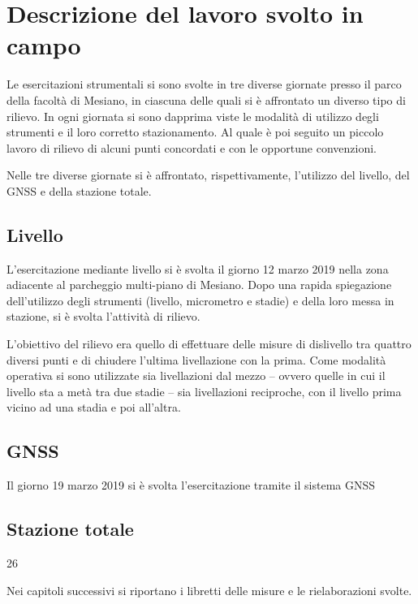 \chapter{Descrizione del lavoro svolto in campo}
Le esercitazioni strumentali si sono svolte in tre diverse giornate presso il  parco della facoltà di Mesiano, in ciascuna delle quali si è affrontato un diverso tipo di rilievo.
In ogni giornata si sono dapprima viste le modalità di utilizzo degli strumenti e il loro corretto stazionamento.
Al quale è poi seguito un piccolo lavoro di rilievo di alcuni punti concordati e con le opportune convenzioni.

Nelle tre diverse giornate si è affrontato, rispettivamente, l'utilizzo del livello, del GNSS e della stazione totale.

\section{Livello}
L'esercitazione mediante livello si è svolta il giorno 12 marzo 2019 nella zona adiacente al parcheggio multi-piano di Mesiano.
Dopo una rapida spiegazione dell'utilizzo degli strumenti (livello, micrometro e stadie) e della loro messa in stazione, si è svolta l'attività di rilievo. 

L'obiettivo del rilievo era quello di effettuare delle misure di dislivello tra quattro diversi punti e di chiudere l'ultima livellazione con la prima. 
Come modalità operativa si sono utilizzate sia livellazioni dal mezzo -- ovvero quelle in cui il livello sta a metà tra due stadie -- sia livellazioni reciproche, con il livello prima vicino ad una stadia e poi all'altra.

  
\section{GNSS}
Il giorno 19 marzo 2019 si è svolta l'esercitazione tramite il sistema GNSS 
\section{Stazione totale}
26 

Nei capitoli successivi si riportano i libretti delle misure e le rielaborazioni svolte.